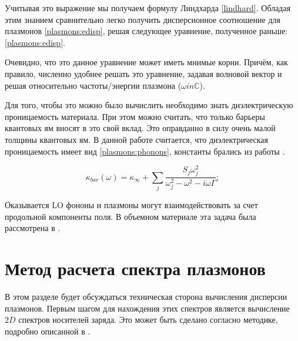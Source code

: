 \documentclass[../main.tex]{subfiles}
\begin{document}
    Учитывая это выражение мы получаем формулу Линдхарда \ref{lindhard}. Обладая 
    этим знанием сравнительно легко получить дисперсионное соотношение для плазмонов
    \ref{plasmons:edisp}, решая следующее уравнение, полученное раньше: \ref{plasmons:edisp}.

    
    Очевидно, что это данное уравнение может иметь мнимые корни. Причём, как правило,
    численно удобнее решать это уравнение, задавая волновой вектор и решая относительно 
    частоты/энергии плазмона ($\omega in \mathbb C$).



    Для того, чтобы это можно было вычислить необходимо знать диэлектрическую 
    проницаемость материала. При этом можно считать, что только барьеры 
    квантовых ям вносят в это свой вклад. Это оправданно в силу очень малой
    толщины квантовых ям. В данной работе считается, что диэлектрическая 
    проницаемость имеет вид \ref{plasmons:phonons}, константы брались
    из работы \cite{palik1998handbook}.

    \begin{equation}
        \label{plasmons:phonons}
        \kappa_{bar}(\omega) = \kappa_\infty + \sum_{j} \frac{S_j \omega_j^2}
                                    {\omega_j^2 - \omega^2 - i \omega \Gamma};
    \end{equation}

    Оказывается LO фононы и плазмоны могут взаимодействовать за счет продольной компоненты поля.
    В объемном материале эта задача была рассмотрена в \cite{peter2002manuel}. 

    \section{Метод расчета спектра плазмонов}
    \label{comp:section}

    В этом разделе будет обсуждаться техническая сторона вычисления дисперсии плазмонов.
    Первым шагом для нахождения этих спектров является вычисление $2D$ спектров носителей заряда. 
    Это может быть сделано согласно методике, подробно описанной в \cite{HgCdTeCalcZholudev}.
    
\end{document}
